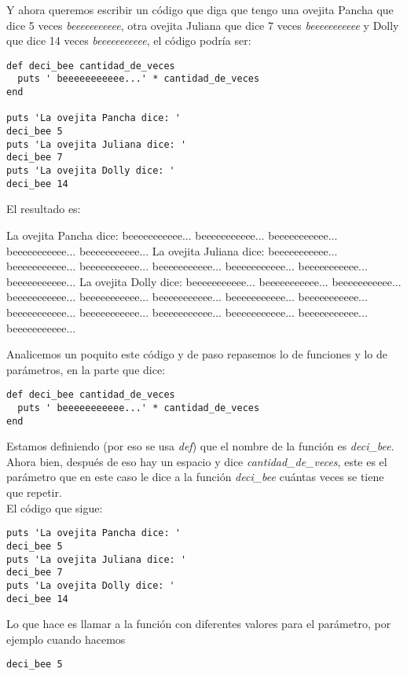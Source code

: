 Y ahora queremos escribir un código que diga que tengo una ovejita Pancha que dice 5 veces \emph{beeeeeeeeeee}, otra ovejita Juliana que dice 7 veces \emph{beeeeeeeeeee} y Dolly que dice 14 veces \emph{beeeeeeeeeee}, el código podría ser:

\begin{lstlisting}
def deci_bee cantidad_de_veces
  puts ' beeeeeeeeeee...' * cantidad_de_veces
end

puts 'La ovejita Pancha dice: ' 
deci_bee 5
puts 'La ovejita Juliana dice: ' 
deci_bee 7
puts 'La ovejita Dolly dice: ' 
deci_bee 14
\end{lstlisting}

El resultado es:
\begin{console-output}
La ovejita Pancha dice: 
beeeeeeeeeee... beeeeeeeeeee... beeeeeeeeeee... beeeeeeeeeee... beeeeeeeeeee...
La ovejita Juliana dice: 
beeeeeeeeeee... beeeeeeeeeee... beeeeeeeeeee... beeeeeeeeeee... beeeeeeeeeee... beeeeeeeeeee... beeeeeeeeeee...
La ovejita Dolly dice: 
beeeeeeeeeee... beeeeeeeeeee... beeeeeeeeeee... beeeeeeeeeee... beeeeeeeeeee... beeeeeeeeeee... beeeeeeeeeee... beeeeeeeeeee... beeeeeeeeeee... beeeeeeeeeee... beeeeeeeeeee... beeeeeeeeeee... beeeeeeeeeee... beeeeeeeeeee...
\end{console-output}

Analicemos un poquito este código y de paso repasemos lo de funciones y lo de parámetros, en la parte que dice:
\begin{lstlisting}
def deci_bee cantidad_de_veces
  puts ' beeeeeeeeeee...' * cantidad_de_veces
end
\end{lstlisting}

Estamos definiendo (por eso se usa \emph{def}) que el nombre de la función es \emph{deci\_bee}. Ahora bien, después de eso hay un espacio y dice \emph{cantidad\_de\_veces}, este es el parámetro que en este caso le dice a la función \emph{deci\_bee} cuántas veces se tiene que repetir.\\

El código que sigue:
\begin{lstlisting}
puts 'La ovejita Pancha dice: ' 
deci_bee 5
puts 'La ovejita Juliana dice: ' 
deci_bee 7
puts 'La ovejita Dolly dice: ' 
deci_bee 14
\end{lstlisting}

Lo que hace es llamar a la función con diferentes valores para el parámetro, por ejemplo cuando hacemos 
\begin{lstlisting}
deci_bee 5
\end{lstlisting}

